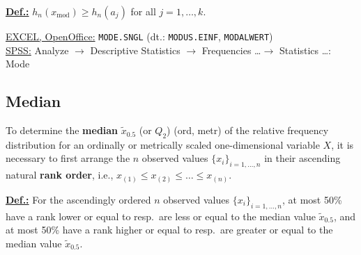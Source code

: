 \medskip
\noindent
\underline{\textbf{Def.:}} $h_{n}(x_\mathrm{mod}) \geq h_{n}(a_{j})$
for all $j=1,\ldots,k$.

\medskip
\noindent
\underline{EXCEL, OpenOffice:} \texttt{MODE.SNGL} (dt.:
\texttt{MODUS.EINF}, \texttt{MODALWERT}) \\
\underline{SPSS:} Analyze $\rightarrow$ Descriptive Statistics
$\rightarrow$ Frequencies \ldots $\rightarrow$ Statistics
\ldots: Mode

\subsection[Median]{Median}
To determine the \textbf{median} $\tilde{x}_{0.5}$ (or $Q_{2}$)
(ord, metr) of the relative frequency distribution for an ordinally
or metrically scaled one-dimensional variable $X$, it is necessary
to first arrange the $n$ observed values $\{x_{i}\}_{i=1,\ldots,n}$ 
in their ascending natural \textbf{rank order}, i.e., $x_{(1)} \leq 
x_{(2)} \leq \ldots \leq x_{(n)}$.

\medskip
\noindent
\underline{\textbf{Def.:}} For the ascendingly ordered $n$
observed values $\{x_{i}\}_{i=1,\ldots,n}$, at most 50\% have a 
rank lower or equal to resp.\ are less or equal to the median 
value $\tilde{x}_{0.5}$, and at most 50\% have a rank higher or 
equal to resp.\ are greater or equal to the median value 
$\tilde{x}_{0.5}$.

